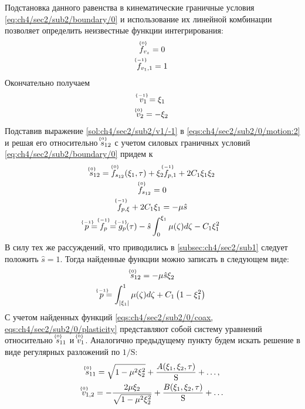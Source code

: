 Подстановка данного равенства в кинематические граничные условия \cref{eq:ch4/sec2/sub2/boundary/0} и использование их линейной комбинации позволяет определить неизвестные функции интегрирования:
\begin{gather*}
  \uindex{f}{0}_{v_{z}} = 0
  \\
  \uindex{f}{-1}_{v_{1},1} = 1
\end{gather*}
Окончательно получаем
\begin{gather}
  \label{sol:ch4/sec2/sub2/v1/-1}
  \uindex{v}{-1}_{1} = \xi_1
  \\
  \label{sol:ch4/sec2/sub2/v2/0}
  \uindex{v}{0}_{2} =  -\xi_2
\end{gather}
Подставив выражение \cref{sol:ch4/sec2/sub2/v1/-1} в \cref{eqs:ch4/sec2/sub2/0/motion:2} и решая его относительно $\uindex{s}{0}_{12}$ с учетом силовых граничных условий \cref{eq:ch4/sec2/sub2/boundary/0} придем к
\begin{gather*}
  \uindex{s}{0}_{12} = \uindex{f}{0}_{s_{12}}(\xi_1, \tau) + \xi_2  \uindex{f}{-1}_{p,1} + 2 C_1 \xi_1 \xi_2
  \\
  \uindex{f}{0}_{s_{12}} = 0
  \\
  \uindex{f}{-1}_{p,\xi} + 2 C_1 \xi_1 = -\mu \hat{s}
  \\
  \uindex{p}{-1}=\uindex{f}{-1}_{p} =\uindex{g}{-1}_{p}(\tau) -\hat{s}\int_0^{\xi_1}{\mu(\zeta)d\zeta} - C_1 \xi_1^2
\end{gather*}
В силу тех же рассуждений, что приводились в \ref{subsec:ch4/sec2/sub1} следует положить $\hat{s} = 1$. Тогда найденные функции можно записать в следующем виде:
\begin{gather}
  \label{sol:ch4/sec2/sub2/s12/0}
  \uindex{s}{0}_{12} = -\mu \hat{s} \xi_2
  \\
  \label{sol:ch4/sec2/sub2/p/-1}
  \uindex{p}{-1} = \int_{\vert\xi_1\vert}^1{\mu(\zeta)d\zeta} + C_1 \left(1-\xi_1^2\right)
\end{gather}
С учетом найденных функций \cref{eqs:ch4/sec2/sub2/0/coax, eqs:ch4/sec2/sub2/0/plasticity} представляют собой систему уравнений относительно $\uindex{s}{0}_{11}$ и $\uindex{v}{0}_{1}$.
Аналогично предыдущему пункту будем искать решение в виде регулярных разложений по $1/\text{S}$:
\begin{gather}
  \uindex{s}{0}_{11} = \sqrt{1-\mu^2\xi_2^2} + \frac{A(\xi_1,\xi_2,\tau)}{\text{S}} + \ldots, \\
  \uindex{v}{0}_{1,2} = -\frac{2\mu \xi_2}{\sqrt{1-\mu^2\xi_2^2}} + \frac{B(\xi_1,\xi_2,\tau)}{\text{S}} + \ldots
\end{gather}
